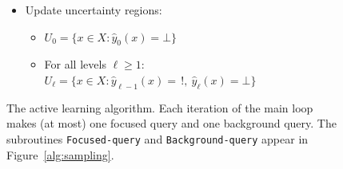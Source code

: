 \documentclass{article}
\def\B{{\mathcal B}}
\def\yh{{\widehat{y}}}
\def\PL{{\mbox{\rm PL}}}
\begin{document}
\begin{figure}[h!]
{\begin{minipage}[t]{6.4in}
\begin{itemize}
\begin{itemize}
\begin{itemize}
\begin{itemize}
\item Determine the possible labels for $x$ at level $\ell$:
$$\PL_\ell(x) = \{s \in \{-1, +1\}: \mbox{there exists $B \in \B_\ell(x)$ with $\yh(B) = s$} \}$$
\item Set
$$
\yh_\ell(x) = 
\left\{
\begin{array}{cl}
+1 & \mbox{if $\PL_\ell(x) = \{+1\}$} \\
-1 &  \mbox{if $\PL_\ell(x) = \{-1\}$} \\
0 & \mbox{if $\PL_\ell(x) = \{\}$} \\
! & \mbox{if $\PL_\ell(x) = \{-1,+1\}$}
\end{array}
\right.
$$
\end{itemize}
\end{itemize}
\item Update uncertainty regions:
\begin{itemize}
\item $U_0 = \{x \in X: \yh_0(x) = \bot\}$
\item For all levels $\ell \geq 1$: $U_\ell = \{x \in X: \yh_{\ell-1}(x) = \,!, \ \yh_\ell(x) = \bot\}$
\end{itemize}
\end{itemize}

\end{itemize}

\end{minipage}}
\caption{The active learning algorithm. Each iteration of the main loop makes (at most) one focused query and one background query. The subroutines {\tt Focused-query} and {\tt Background-query} appear in Figure~\ref{alg:sampling}.}
\label{alg:main}
\end{figure}
\end{document}
